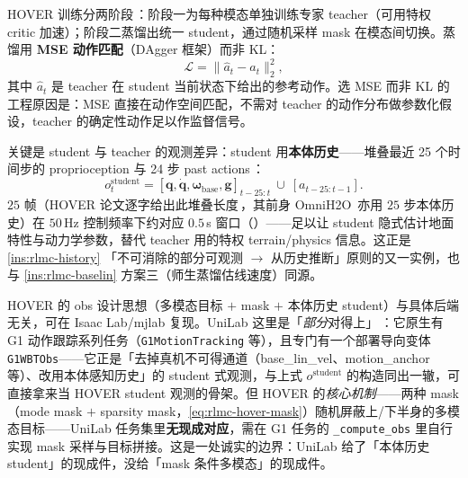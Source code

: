 HOVER 训练分两阶段\,\cite{he2025hover}：阶段一为每种模态单独训练专家 teacher（可用特权 critic 加速）；阶段二蒸馏出统一 student，通过随机采样 mask 在模态间切换。蒸馏用 \textbf{MSE 动作匹配}（DAgger 框架）而非 KL：
\begin{equation}
\mathcal L = \lVert\hat a_t - a_t\rVert_2^2,
\label{eq:rlmc-hover-dagger}
\end{equation}
其中 $\hat a_t$ 是 teacher 在 student 当前状态下给出的参考动作。选 MSE 而非 KL 的工程原因是：MSE 直接在动作空间匹配，不需对 teacher 的动作分布做参数化假设，teacher 的确定性动作足以作监督信号。

关键是 student 与 teacher 的观测差异：student 用\textbf{本体历史}——堆叠最近 25 个时间步的 proprioception 与 24 步 past actions\,\cite{he2025hover}：
\begin{equation*}
o^{\text{student}}_t = [\mathbf q,\dot{\mathbf q},\boldsymbol\omega_{\text{base}},\mathbf g]_{t-25:t}\ \cup\ [a_{t-25:t-1}].
\end{equation*}
$25$ 帧（HOVER 论文逐字给出此堆叠长度\,\cite{he2025hover}，其前身 OmniH2O\,\cite{he2024omnih2o} 亦用 $25$ 步本体历史）在 $50\,$Hz 控制频率下约对应 $0.5\,$s 窗口（）——足以让 student 隐式估计地面特性与动力学参数，替代 teacher 用的特权 terrain/physics 信息。这正是 \cref{ins:rlmc-history} 「不可消除的部分可观测 $\to$ 从历史推断」原则的又一实例，也与 \cref{ins:rlmc-baselin} 方案三（师生蒸馏估线速度）同源。

\begin{note}
HOVER 的 obs 设计思想（多模态目标 $+$ mask $+$ 本体历史 student）与具体后端无关，可在 Isaac Lab/mjlab 复现。UniLab 这里是「\emph{部分}对得上」\,\cite{unilab2026}：它原生有 G1 动作跟踪系列任务（\verb|G1MotionTracking| 等），且专门有一个部署导向变体 \verb|G1WBTObs|——它正是「去掉真机不可得通道（base\_lin\_vel、motion\_anchor 等）、改用本体感知历史」的 student 式观测，与上式 $o^{\text{student}}$ 的构造同出一辙，可直接拿来当 HOVER student 观测的骨架。但 HOVER 的\emph{核心机制}——两种 mask（mode mask $+$ sparsity mask，\cref{eq:rlmc-hover-mask}）随机屏蔽上/下半身的多模态目标——UniLab 任务集里\textbf{无现成对应}，需在 G1 任务的 \verb|_compute_obs| 里自行实现 mask 采样与目标拼接。这是一处诚实的边界：UniLab 给了「本体历史 student」的现成件，没给「mask 条件多模态」的现成件。
\end{note}


